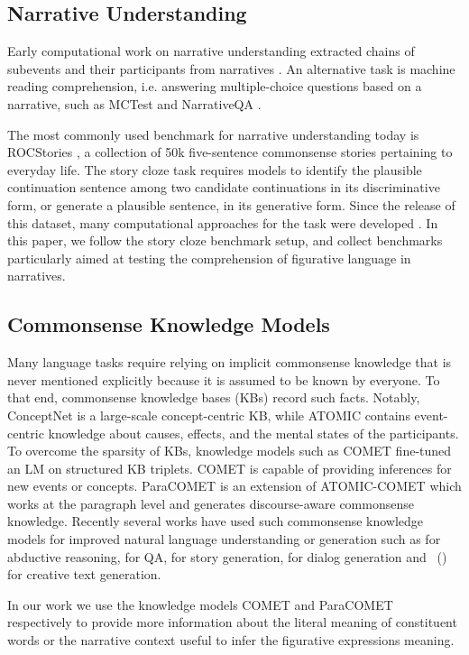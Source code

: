 \subsection{Narrative Understanding}
\label{sec:bg:narratives}
Early computational work on narrative understanding extracted chains of subevents and their participants from narratives \cite{chambers-jurafsky-2009-unsupervised}. An alternative task is machine reading comprehension, i.e. answering multiple-choice questions based on a narrative, such as MCTest \cite{richardson-etal-2013-mctest} and NarrativeQA \cite{kocisky-etal-2018-narrativeqa}. 

The most commonly used benchmark for narrative understanding today is ROCStories \cite{mostafazadeh-etal-2016-corpus}, a collection of 50k five-sentence commonsense stories pertaining to everyday life. The story cloze task requires models to identify the plausible continuation sentence among two candidate continuations in its discriminative form, or generate a plausible sentence, in its generative form. Since the release of this dataset, many computational approaches for the task were developed \cite[][\emph{inter alia}]{chaturvedi-etal-2017-story,schwartz-etal-2017-story,cai-etal-2017-pay,srinivasan-etal-2018-simple,ijcai2019-249,cui2020discriminative,brown2020language}. In this paper, we follow the story cloze benchmark setup, and collect benchmarks particularly aimed at testing the comprehension of figurative language in narratives. 

\subsection{Commonsense Knowledge Models}
\label{sec:bg:knowledge_models}

Many language tasks require relying on implicit commonsense knowledge that is never mentioned explicitly because it is assumed to be known by everyone. To that end, commonsense knowledge bases (KBs) record such facts. Notably, ConceptNet \cite{speer2017conceptnet} is a large-scale concept-centric KB, while ATOMIC \cite{atomic} contains event-centric knowledge about causes, effects, and the mental states of the participants. To overcome the sparsity of KBs, knowledge models such as COMET \cite{bosselut-etal-2019-comet,Hwang2021COMETATOMIC2O} fine-tuned an LM on structured KB triplets. COMET is capable of providing inferences for new events or concepts. ParaCOMET \cite{Gabriel2021ParagraphLevelCT} is an extension of ATOMIC-COMET which works at the paragraph level and generates discourse-aware commonsense knowledge. Recently several works have used such commonsense knowledge models for improved natural language understanding or generation such as  for abductive reasoning,  for QA,  for story generation,  for dialog generation and \citeauthor{chakrabarty-etal-2020-r}~(\citeyear{chakrabarty-etal-2020-r,chakrabarty-etal-2020-generating,chakrabarty-etal-2021-mermaid}) for creative text generation.

In our work we use the knowledge models COMET \cite{Hwang2021COMETATOMIC2O} and ParaCOMET \cite{Gabriel2021ParagraphLevelCT} respectively to provide more information about the literal meaning of constituent words or the narrative context useful to infer the figurative expressions meaning.
